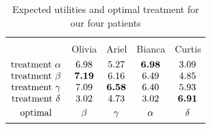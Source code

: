 \documentclass[utf8]{FrontiersinHarvard} %
\renewcommand*{\|}[1][]{\nonscript\:#1\vert\nonscript\:\mathopen{}}
\begin{document}
\medskip
\begin{table}[!h]
  \centering
  \begin{tabular}{lcccc}
    \hline\\[-1.5\jot]
    &{\small Olivia} &{\small Ariel} &{\small Bianca} &{\small Curtis}
    \\[\jot]
    $\begin{matrix}
      \text{treatment }\alpha\\ 
      \text{treatment }\beta\\ 
      \text{treatment }\gamma\\ 
      \text{treatment }\delta\\[\jot]
      \text{optimal}
    \end{matrix}$
    &
    $\begin{matrix}6.98\\\bm{7.19}\\7.09\\3.02\\[\jot]\beta\end{matrix}$
    &
    $\begin{matrix}5.27\\6.16\\\bm{6.58}\\4.73\\[\jot]\gamma\end{matrix}$
    &
    $\begin{matrix}\bm{6.98}\\6.49\\6.40\\3.02\\[\jot]\alpha\end{matrix}$
    &
    $\begin{matrix}3.09\\4.85\\5.93\\\bm{6.91}\\[\jot]\delta\end{matrix}$
    \\[5\jot]
    \hline
  \end{tabular}
  \caption{Expected utilities and optimal treatment for our four patients}\label{tab:exp_utilities_patients}
\end{table}


\end{document}
